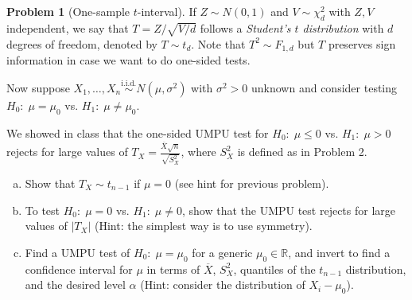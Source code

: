 \documentclass{article}
\newcommand{\RR}{\mathbb{R}}
\newcommand{\simiid}{\overset{\text{i.i.d.}}{\sim}}
\theoremstyle{definition}
\newtheorem{problem}{Problem}
\begin{document}
\begin{problem}[One-sample $t$-interval]
\label{prob:one-sample-t-interval}
If $Z\sim N(0,1)$ and $V \sim \chi_d^2$ with $Z,V$ independent, we say that $T=Z/\sqrt{V/d}$ follows a {\em Student's $t$ distribution} with $d$ degrees of freedom, denoted by $T\sim t_d$. Note that $T^2 \sim F_{1,d}$ but $T$ preserves sign information in case we want to do one-sided tests.

Now suppose $X_1,\ldots,X_n \simiid N(\mu,\sigma^2)$ with $\sigma^2>0$ unknown and consider testing $H_0:\; \mu = \mu_0$ vs. $H_1:\; \mu \neq \mu_0$.

We showed in class that the one-sided UMPU test for $H_0:\;\mu \leq 0$ vs. $H_1:\; \mu > 0$ rejects for large values of $T_X = \frac{\overline X \sqrt{n}}{\sqrt{S_X^2}}$, where $S_X^2$ is defined as in Problem 2.

\begin{enumerate}[(a)]
\item Show that $T_X\sim t_{n-1}$ if $\mu = 0$ (see hint for previous problem).




\item To test $H_0:\;\mu=0$ vs. $H_1:\; \mu \neq 0$, show that the UMPU test rejects for large values of $|T_X|$ (Hint: the simplest way is to use symmetry).



\item Find a UMPU test of $H_0:\; \mu = \mu_0$ for a generic $\mu_0\in\RR$, and invert to find a confidence interval for $\mu$ in terms of $\overline X$, $S_X^2$, quantiles of the $t_{n-1}$ distribution, and the desired level $\alpha$ (Hint: consider the distribution of $X_i-\mu_0$).



\end{enumerate}
\end{problem}
\end{document}
